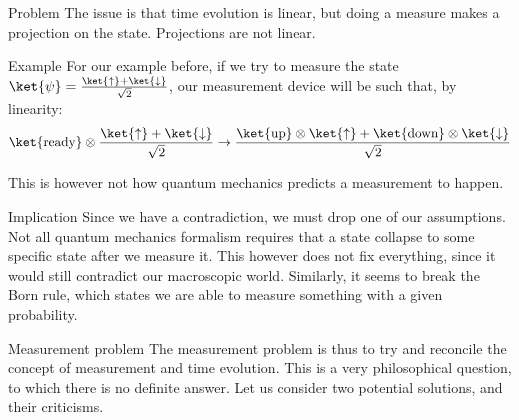 \documentclass[a4paper]{article}
\begin{document}
\begin{parag}{Problem}
    The issue is that time evolution is linear, but doing a measure makes a projection on the state. Projections are not linear.

    \begin{subparag}{Example}
        For our example before, if we try to measure the state $\ket{\psi} = \frac{\ket{\uparrow} + \ket{\downarrow}}{\sqrt{2}}$, our measurement device will be such that, by linearity: 
        \[\ket{\text{ready}} \otimes \frac{\ket{\uparrow} + \ket{\downarrow}}{\sqrt{2}} \to \frac{\ket{\text{up}} \otimes \ket{\uparrow} + \ket{\text{down}} \otimes \ket{\downarrow}}{\sqrt{2}}\]
        
        This is however not how quantum mechanics predicts a measurement to happen.
    \end{subparag}

    \begin{subparag}{Implication}
        Since we have a contradiction, we must drop one of our assumptions. Not all quantum mechanics formalism requires that a state collapse to some specific state after we measure it. This however does not fix everything, since it would still contradict our macroscopic world. Similarly, it seems to break the Born rule, which states we are able to measure something with a given probability.
    \end{subparag}
\end{parag}

\begin{parag}{Measurement problem}
    The measurement problem is thus to try and reconcile the concept of measurement and time evolution. This is a very philosophical question, to which there is no definite answer. Let us consider two potential solutions, and their criticisms.
\end{parag}
\end{document}
